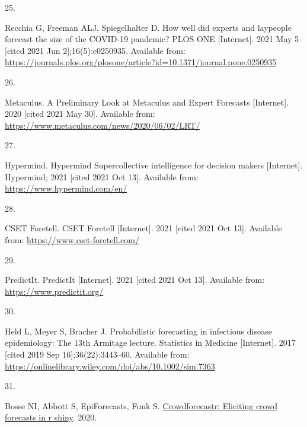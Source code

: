 \documentclass[
]{article}
\newlength{\cslhangindent}
\newlength{\csllabelwidth}
\newlength{\cslentryspacingunit} %
\newenvironment{CSLReferences}[2] %
 {%
  \setlength{\parindent}{0pt}
  \ifodd #1
  \let\oldpar\par
  \def\par{\hangindent=\cslhangindent\oldpar}
  \fi
  \setlength{\parskip}{#2\cslentryspacingunit}
 }%
 {}
\newcommand{\CSLLeftMargin}[1]{\parbox[t]{\csllabelwidth}{#1}}
\newcommand{\CSLRightInline}[1]{\parbox[t]{\linewidth - \csllabelwidth}{#1}\break}
\providecommand{\DIFaddbegin}{} %
\providecommand{\DIFaddend}{} %
\providecommand{\DIFdelbegin}{} %
\providecommand{\DIFdelend}{} %
\newcommand{\DIFscaledelfig}{0.5}
\newlength{\DIFdelgraphicswidth} %
\newlength{\DIFdelgraphicsheight} %
\newcommand{\DIFaddincludegraphics}[2][]{{\color{blue}\fbox{\DIFOincludegraphics[#1]{#2}}}} %
\newcommand{\DIFdelincludegraphics}[2][]{%
\sbox{\DIFdelgraphicsbox}{\DIFOincludegraphics[#1]{#2}}%
\settoboxwidth{\DIFdelgraphicswidth}{\DIFdelgraphicsbox} %
\settoboxtotalheight{\DIFdelgraphicsheight}{\DIFdelgraphicsbox} %
\scalebox{\DIFscaledelfig}{%
\parbox[b]{\DIFdelgraphicswidth}{\usebox{\DIFdelgraphicsbox}\\[-\baselineskip] \rule{\DIFdelgraphicswidth}{0em}}\llap{\resizebox{\DIFdelgraphicswidth}{\DIFdelgraphicsheight}{%
\setlength{\unitlength}{\DIFdelgraphicswidth}%
\begin{picture}(1,1)%
\thicklines\linethickness{2pt} %
{\color[rgb]{1,0,0}\put(0,0){\framebox(1,1){}}}%
{\color[rgb]{1,0,0}\put(0,0){\line( 1,1){1}}}%
{\color[rgb]{1,0,0}\put(0,1){\line(1,-1){1}}}%
\end{picture}%
}\hspace*{3pt}}} %
} %
\DeclareRobustCommand{\DIFaddbegin}{\DIFOaddbegin \let\includegraphics\DIFaddincludegraphics} %
\DeclareRobustCommand{\DIFaddend}{\DIFOaddend \let\includegraphics\DIFOincludegraphics} %
\DeclareRobustCommand{\DIFdelbegin}{\DIFOdelbegin \let\includegraphics\DIFdelincludegraphics} %
\DeclareRobustCommand{\DIFdelend}{\DIFOaddend \let\includegraphics\DIFOincludegraphics} %
\begin{document}
\begin{CSLReferences}{0}{0}
\leavevmode{}%
\CSLLeftMargin{25. }
\CSLRightInline{Recchia G, Freeman ALJ, Spiegelhalter D. How well did experts and laypeople forecast the size of the {COVID-19} pandemic? PLOS ONE {[}Internet{]}. 2021 May 5 {[}cited 2021 Jun 2{]};16(5):e0250935. Available from: \url{https://journals.plos.org/plosone/article?id=10.1371/journal.pone.0250935}}

\leavevmode{}%
\CSLLeftMargin{26. }
\CSLRightInline{Metaculus. A {Preliminary Look} at {Metaculus} and {Expert Forecasts} {[}Internet{]}. 2020 {[}cited 2021 May 30{]}. Available from: \url{https://www.metaculus.com/news/2020/06/02/LRT/}}

\leavevmode{}%
\CSLLeftMargin{27. }
\CSLRightInline{Hypermind. Hypermind \textbar{} {Supercollective} intelligence for decision makers {[}Internet{]}. {Hypermind}; 2021 {[}cited 2021 Oct 13{]}. Available from: \url{https://www.hypermind.com/en/}}

\leavevmode{}%
\CSLLeftMargin{28. }
\CSLRightInline{CSET Foretell. {CSET Foretell} {[}Internet{]}. 2021 {[}cited 2021 Oct 13{]}. Available from: \url{https://www.cset-foretell.com/}}

\leavevmode{}%
\CSLLeftMargin{29. }
\CSLRightInline{PredictIt. {PredictIt} {[}Internet{]}. 2021 {[}cited 2021 Oct 13{]}. Available from: \url{https://www.predictit.org/}}

\leavevmode{}%
\CSLLeftMargin{30. }
\CSLRightInline{Held L, Meyer S, Bracher J. Probabilistic forecasting in infectious disease epidemiology: The 13th {Armitage} lecture. Statistics in Medicine {[}Internet{]}. 2017 {[}cited 2019 Sep 16{]};36(22):3443--60. Available from: \url{https://onlinelibrary.wiley.com/doi/abs/10.1002/sim.7363}}

\leavevmode{}%
\CSLLeftMargin{31. }
\DIFdelbegin %
\DIFdelend \DIFaddbegin \CSLRightInline{Bosse NI, Abbott S, EpiForecasts, Funk S. \href{https://doi.org/10.5281/zenodo.4618519}{Crowdforecastr: Eliciting crowd forecasts in r shiny}. 2020. }
\DIFaddend 


\end{CSLReferences}
\end{document}
